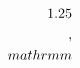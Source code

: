 \documentclass[preview]{standalone}
\begin{document}
\begin{align*}
\special{dvisvgm:raw <g id='unique000'>}1.25\\,\\mathrm{m}\special{dvisvgm:raw </g>}
\end{align*}
\end{document}
